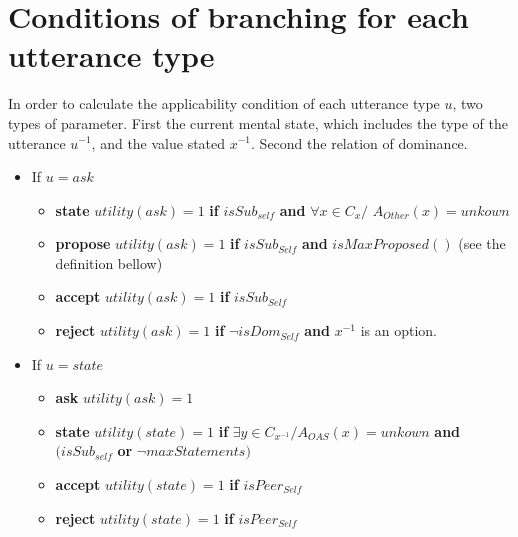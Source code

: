 \documentclass{article}
\begin{document}
	\title{\vskip -10pt}
	
	\author{Lydia Ould Ouali, Charles Rich \and
		Nicolas Sabouret }
	
	\section{Conditions of branching for each utterance type}
	In order to calculate the applicability condition of each utterance type $u$, two types of parameter. First the current mental state, which includes the type of the utterance $u^{-1}$, and the value stated $x^{-1}$. Second the relation of dominance.
	\begin{itemize}
		\item If $u =ask $ 
		\begin{itemize}
			\item\textbf{state}
			\subitem $utility(ask) = 1$ \textbf{ if } $ isSub_{self}$ \textbf{ and } {$\forall x \in C_{x} /$ $ A_{Other} (x) = unkown$ }
			
			
			\item \textbf{propose}	
			\subitem $utility(ask) = 1$ \textbf{ if } $isSub_{Self}$ \textbf{ and } $isMaxProposed()$ (see the definition bellow)
			
			
			\item \textbf{accept}	
			\subitem $utility(ask) = 1$ \textbf{ if } $isSub_{Self}$
			
			
			\item \textbf{reject}	
			\subitem $utility(ask) =1 $ \textbf{ if } $\neg isDom_{Self}$ \textbf{ and } $x^{-1}$ is an option.
			
		\end{itemize}
		\item If $u =state$
		\begin{itemize}
			\item \textbf{ask}
			\subitem $utility(ask) = 1$
			\item \textbf{state}
			\subitem $utility(state) = 1$ \textbf{ if } $ \exists y \in C_{x^{-1}} / A_{OAS} (x) = unkown$ \textbf{ and } $ (isSub_{self}$  \textbf{ or } $\neg maxStatements)$
			
			\item \textbf{accept}
			\subitem $utility(state) = 1$ \textbf{ if } $isPeer_{Self}$
			
			\item \textbf{reject}
			\subitem $utility(state) = 1$ \textbf{ if } $isPeer_{Self}$
			
			
			

\end{itemize}
\end{itemize}
\end{document}
